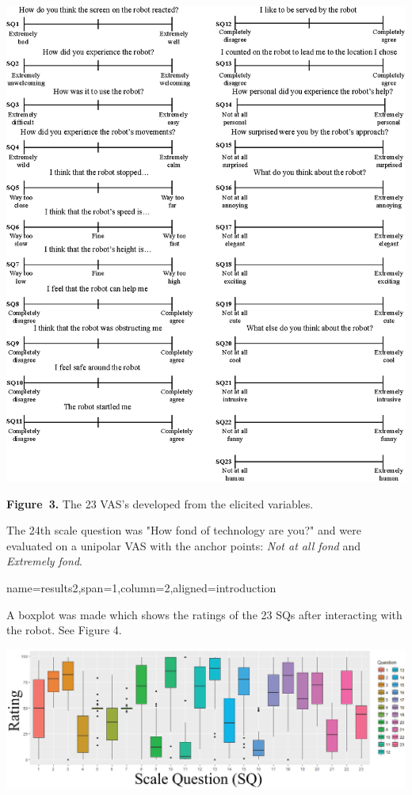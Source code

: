 \documentclass[paperwidth=118cm,paperheight=84cm,landscape,fontscale=0.2941]{baposter}
\begin{document}
\begin{poster}
{\vspace{-10pt}
\begin{center}
	\includegraphics[width=1.0\linewidth]{AllScalesSpaceBig.eps}

\textbf{Figure~3. }\footnotesize{The 23 VAS's developed from the elicited variables.}
\end{center}
\vspace{-15pt}
\medskip
The 24th scale question was "How fond of technology are you?" and were evaluated on a unipolar VAS with the anchor points: \textit{Not at all fond} and \textit{Extremely fond}.
}



{name=results2,span=1,column=2,aligned=introduction}
{\parskip 5pt
A boxplot was made which shows the ratings of the 23 SQs after interacting with the robot. See Figure 4. 
\begin{center}

\vspace{-10pt}
	\includegraphics[width=\linewidth]{BoksplotFarver.eps}


\end{center}}
\end{poster}
\end{document}
